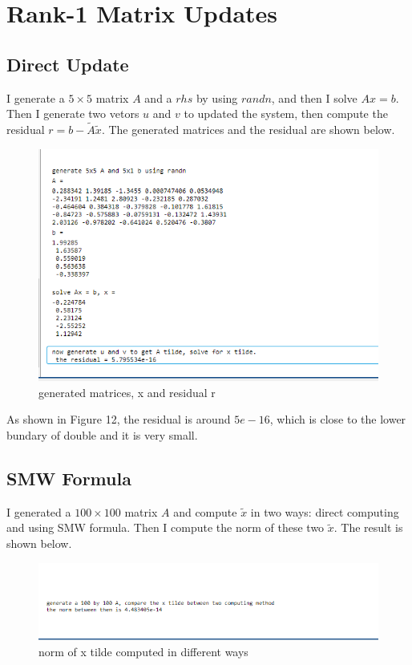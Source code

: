 \documentclass[a4paper]{article}
\begin{document}
\section{Rank-1 Matrix Updates}
\subsection{Direct Update}
I generate a $5 \times 5$ matrix $A$ and a $rhs$ by using $randn$, and then I solve $Ax=b$. Then I generate two vetors $u$ and $v$ to updated the system, then compute the residual $r=b-\tilde{A}\tilde{x}$. The generated matrices and the residual are shown below.

\begin{figure}[H] 
\centering 
\includegraphics[width=1.0\textwidth]{3.1-1.png}
\caption{generated matrices, x and residual r} 
\label{Fig.3.1-1} 
\end{figure}

As shown in Figure 12, the residual is around $5e-16$, which is close to the lower bundary of double and it is very small.
\subsection{SMW Formula}
I generated a $100\times100$ matrix $A$ and compute $\tilde{x}$ in two ways: direct computing and using SMW formula. Then I compute the norm of these two $\tilde{x}$. The result is shown below.

\begin{figure}[H] 
\centering 
\includegraphics[width=1.0\textwidth]{3.2-1.png}
\caption{norm of x tilde computed in different ways} 
\label{Fig.3.2-1} 
\end{figure}
\end{document}
